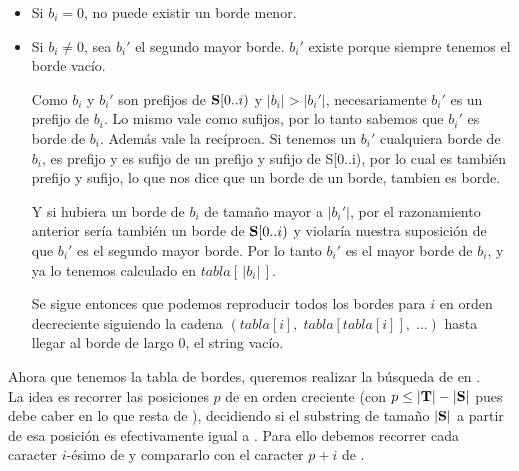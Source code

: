\begin{itemize}
    \item Si $b_i = 0$, no puede existir un borde menor.
    \item Si $b_i \neq 0$, sea $b_i'$ el segundo mayor borde. $b_i'$ existe porque siempre tenemos el borde vacío.

        Como $b_i$ y $b_i'$ son prefijos de $\textbf{S}[0..i)$ y $|b_i| > |b_i'|$, necesariamente $b_i'$ es un prefijo de $b_i$. Lo mismo vale como sufijos, por lo tanto sabemos que $b_i'$ es borde de $b_i$.
        Además vale la recíproca. Si tenemos un $b_i'$ cualquiera borde de $b_i$, es prefijo y es sufijo de un prefijo y sufijo de S[0..i), por lo cual es también prefijo y sufijo, lo que nos dice que un borde de un borde, tambien es borde.

        Y si hubiera un borde de $b_i$ de tamaño mayor a $|b_i'|$, por el razonamiento anterior sería también un borde de $\textbf{S}[0..i)$ y violaría nuestra suposición de que $b_i'$ es el segundo mayor borde. Por lo tanto $b_i'$ es el mayor borde de $b_i$, y ya lo tenemos calculado en $tabla[ \,|b_i|\, ]$.

        Se sigue entonces que podemos reproducir todos los bordes para $i$ en orden decreciente siguiendo la cadena $(tabla[i], \; tabla[tabla[i]], \; \ldots)$ hasta llegar al borde de largo 0, el string vacío.

\end{itemize}

\vspace*{1em}

Ahora que tenemos la tabla de bordes, queremos realizar la búsqueda de \sS en \sT.
\\

La idea es recorrer las posiciones $p$ de \sT en orden creciente (con $p \leq |\textbf{T}| - |\textbf{S}|$ pues \sS debe caber en lo que resta de \sT), decidiendo si el substring de tamaño $|\textbf{S}|$ a partir de esa posición es efectivamente igual a \sS. Para ello debemos recorrer cada caracter $i$-ésimo de \sS y compararlo con el caracter $p+i$ de \sT.

